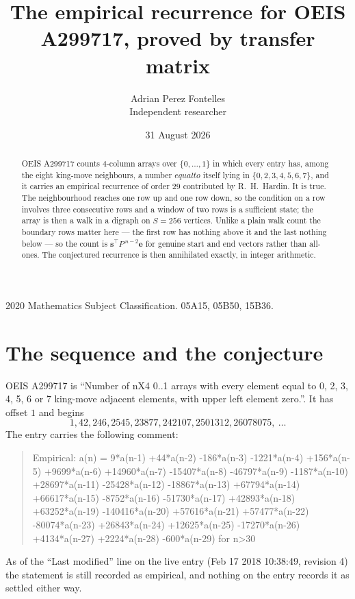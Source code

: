 \documentclass[11pt,a4paper]{article}
\title{The empirical recurrence for OEIS A299717, proved by transfer matrix}
\author{Adrian Perez Fontelles\\ \small Independent researcher}
\date{31 August 2026}
\theoremstyle{plain}
\theoremstyle{definition}
\begin{document}
\maketitle

\begin{abstract}
OEIS A299717 counts $4$-column arrays over $\{0,\dots,1\}$ in which every entry has,
among the eight king-move neighbours, a number $equal to$ itself lying in $\{0,2,3,4,5,6,7\}$, and it carries an empirical
recurrence of order $29$ contributed by R.~H.~Hardin. It is true. The neighbourhood
reaches one row up and one row down, so the condition on a row involves three consecutive
rows and a window of two rows is a sufficient state; the array is then a walk in a digraph
on $S=256$ vertices. Unlike a plain walk count the boundary rows matter here --- the first
row has nothing above it and the last nothing below --- so the count is
$\mathbf{s}^{\!\top}P^{\,n-2}\mathbf{e}$ for genuine start and end vectors rather than
all-ones. The conjectured recurrence is then annihilated exactly, in integer arithmetic.
\end{abstract}

\noindent\small 2020 Mathematics Subject Classification. 05A15, 05B50, 15B36.\normalsize

\section{The sequence and the conjecture}

OEIS A299717 is ``Number of nX4 0..1 arrays with every element equal to 0, 2, 3, 4, 5, 6 or 7 king-move adjacent elements, with upper left element zero.''. It has offset
$1$ and begins
\[
1, 42, 246, 2545, 23877, 242107, 2501312, 26078075,\ \dots
\]
The entry carries the following comment:
\begin{quote}\small
Empirical: a(n) = 9*a(n-1) +44*a(n-2) -186*a(n-3) -1221*a(n-4) +156*a(n-5) +9699*a(n-6) +14960*a(n-7) -15407*a(n-8) -46797*a(n-9) -1187*a(n-10) +28697*a(n-11) -25428*a(n-12) -18867*a(n-13) +67794*a(n-14) +66617*a(n-15) -8752*a(n-16) -51730*a(n-17) +42893*a(n-18) +63252*a(n-19) -140416*a(n-20) +57616*a(n-21) +57477*a(n-22) -80074*a(n-23) +26843*a(n-24) +12625*a(n-25) -17270*a(n-26) +4134*a(n-27) +2224*a(n-28) -600*a(n-29) for n>30
\end{quote}
As of the ``Last modified'' line on the live entry (Feb 17 2018 10:38:49, revision
4) the statement is still recorded as empirical, and nothing on the entry
records it as settled either way.
\end{document}
